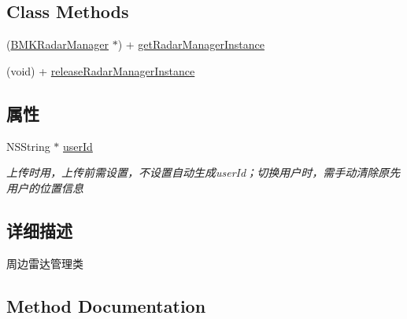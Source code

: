 \subsection*{Class Methods}
\begin{DoxyCompactItemize}
\item 
(\hyperlink{interface_b_m_k_radar_manager}{B\+M\+K\+Radar\+Manager} $\ast$) + \hyperlink{interface_b_m_k_radar_manager_a2f2a861863cc493c4ff5f4927d27dcee}{get\+Radar\+Manager\+Instance}
\item 
(void) + \hyperlink{interface_b_m_k_radar_manager_a506871b092ea0eb52516f26f0346a9e9}{release\+Radar\+Manager\+Instance}
\end{DoxyCompactItemize}
\subsection*{属性}
\begin{DoxyCompactItemize}
\item 
\hypertarget{interface_b_m_k_radar_manager_ac80937e0e16c44a7ff7a99fb4f4cddca}{}N\+S\+String $\ast$ \hyperlink{interface_b_m_k_radar_manager_ac80937e0e16c44a7ff7a99fb4f4cddca}{user\+Id}\label{interface_b_m_k_radar_manager_ac80937e0e16c44a7ff7a99fb4f4cddca}

\begin{DoxyCompactList}\small\item\em 上传时用，上传前需设置，不设置自动生成user\+Id；切换用户时，需手动清除原先用户的位置信息 \end{DoxyCompactList}\end{DoxyCompactItemize}


\subsection{详细描述}
周边雷达管理类 

\subsection{Method Documentation}
\hypertarget{interface_b_m_k_radar_manager_a82396fd5134572b965e2afb39c592a48}{}
